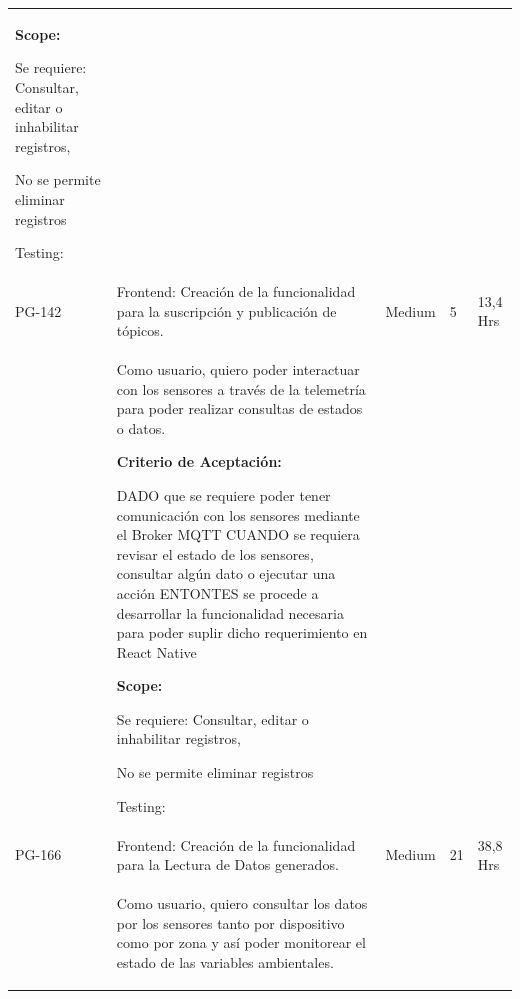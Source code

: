 \documentclass[11pt]{charter}
\begin{document}
\begin{landscape}
\begin{tabularx}{\linewidth}{@{}|p{1.3cm}|p{17cm}|p{1.7cm}|p{1.5cm}|p{1.7cm}|@{}}
\begin{description}
                   \item \textbf{Scope:}                  
                         \item Se requiere: Consultar, editar o inhabilitar registros, 
                         \item No se permite eliminar registros                 
                   \item Testing:
            \end{description}      &  &     & \\
PG-142   & Frontend: Creación de la   funcionalidad para la suscripción y publicación de tópicos.                 & Medium             & 5   & 13,4  Hrs         \\
         &  \begin{description}                 
                   \item Como usuario, quiero poder   interactuar con los sensores a través de la telemetría para poder realizar   consultas de estados o datos.                 
                   \item \textbf{Criterio de Aceptación:}                 
                   \item DADO que se requiere poder tener comunicación con los sensores mediante el   Broker MQTT CUANDO se requiera revisar el estado de los sensores, consultar algún dato   o ejecutar una acción ENTONTES se procede a desarrollar la funcionalidad necesaria para poder   suplir dicho requerimiento en React Native                
                   \item \textbf{Scope:}                  
                         \item Se requiere: Consultar, editar o inhabilitar registros, 
                         \item No se permite eliminar registros                 
                   \item Testing:
            \end{description}            &  &     & \\
PG-166   & Frontend: Creación de la   funcionalidad para la Lectura de Datos generados.         & Medium             & 21  & 38,8  Hrs         \\
         &  \begin{description}                 
                   \item Como usuario, quiero consultar   los datos por los sensores tanto por dispositivo como por zona y así poder   monitorear el estado de las variables ambientales.                 

\end{description}
\end{tabularx}
\end{landscape}
\end{document}
